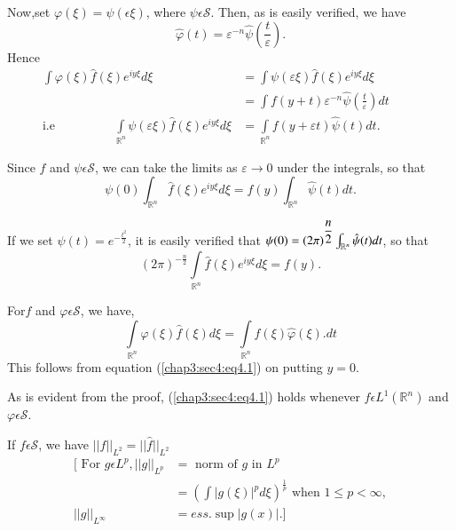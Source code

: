 Now,\pageoriginale set $\varphi (\xi) = \psi (\epsilon \xi)$, where $\psi
\epsilon \mathscr{S}$. Then, as is easily verified, we have 
$$
\hat{\varphi} (t) = \varepsilon ^{-n} \hat{\psi} (\frac{t}{\varepsilon}).
$$
Hence  
\begin{align*}
  \int \varphi (\xi)   \hat{f} (\xi) e^{i y \xi} d \xi
  &= \int \psi (\varepsilon \xi) \hat{f} (\xi) e^{iy \xi} d \xi\\
  &= \int f (y + t) \varepsilon ^{-n} \hat{\psi}
  \left(\frac{t}{\varepsilon}\right) dt\hspace{1cm}\\
  \text{i.e}\hspace{2cm}
  \int\limits_{\mathbb{R}^n} \psi (\varepsilon \xi) \hat{f} (\xi) e^{iy
    \xi} d\xi &= \int\limits_{\mathbb{R}^n} f (y+\varepsilon t)
  \hat{\psi} (t) dt. 
\end{align*}

Since $f$ and $\psi \epsilon \mathscr{S}$, we can take the limits
as $\varepsilon \to 0$ under the integrals, so that  
$$
\psi (0) \int_{\mathbb{R}^n} \hat{f}(\xi) e^{iy \xi} d\xi = f (y)
\int_{\mathbb{R}^n} \hat{\psi} (t) dt. 
$$

If we set $\psi (t) = e^{-\frac{t^2}{2}}$, it is easily verified that $\psi (0)
= (2 \pi)^{\dfrac{n}{2}} \int_{\mathbb{R}^n}\break \hat{\psi} (t) dt$, so
that 
$$
(2 \pi)^{-\frac{n}{2}} \int\limits_{\mathbb{R}^n} \hat{f}(\xi) e^{iy
  \xi} d \xi = f(y). 
$$

\begin{coro*}%
  For\pageoriginale $f$ and $\varphi \epsilon \mathscr{S}$, we have,
  $$
  \int\limits_{\mathbb{R}^n} \varphi (\xi) \hat{f} (\xi) d \xi =
  \int\limits_{\mathbb{R}^n} f (\xi) \hat{\varphi} (\xi).dt 
  $$
  This follows from equation (\ref{chap3:sec4:eq4.1}) on putting $y = 0$.
\end{coro*} 

\begin{remark*}%
  As is evident from the proof, (\ref{chap3:sec4:eq4.1}) holds
  whenever $f \epsilon 
  L^1 (\mathbb{R}^n)$ and $\varphi \epsilon \mathscr{S}$. 
\end{remark*} 

\begin{lemma*}%
  If $f \epsilon \mathscr{S}$, we have $||f||_{L^2} = ||\hat{f}||_{L^2}$
  \begin{align*}
    \big[ \text{ For } g \epsilon L^p, ||g||_{L^p} & = \text{ norm
        of } g \text{ in } L^p\\ 
      &  = \left(\int |g (\xi)|^p d  \xi\right)^{\frac{1}{p}} \text{ when } 1 \le
      p < \infty,\\ 
      || g ||_{L^\infty} & = ess. \sup |g (x)|.  \big]
  \end{align*}
\end{lemma*} 

